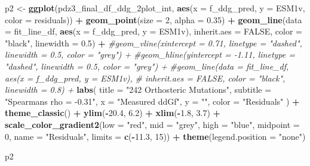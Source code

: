 \documentclass[
]{article}
\newenvironment{Shaded}{\begin{snugshade}}{\end{snugshade}}
\newcommand{\AttributeTok}[1]{\textcolor[rgb]{0.13,0.29,0.53}{#1}}
\newcommand{\CommentTok}[1]{\textcolor[rgb]{0.56,0.35,0.01}{\textit{#1}}}
\newcommand{\ConstantTok}[1]{\textcolor[rgb]{0.56,0.35,0.01}{#1}}
\newcommand{\DecValTok}[1]{\textcolor[rgb]{0.00,0.00,0.81}{#1}}
\newcommand{\FloatTok}[1]{\textcolor[rgb]{0.00,0.00,0.81}{#1}}
\newcommand{\FunctionTok}[1]{\textcolor[rgb]{0.13,0.29,0.53}{\textbf{#1}}}
\newcommand{\NormalTok}[1]{#1}
\newcommand{\OtherTok}[1]{\textcolor[rgb]{0.56,0.35,0.01}{#1}}
\newcommand{\SpecialCharTok}[1]{\textcolor[rgb]{0.81,0.36,0.00}{\textbf{#1}}}
\newcommand{\StringTok}[1]{\textcolor[rgb]{0.31,0.60,0.02}{#1}}
\begin{document}
\begin{Shaded}
\begin{Highlighting}[]
\NormalTok{p2 }\OtherTok{\textless{}{-}} \FunctionTok{ggplot}\NormalTok{(pdz3\_final\_df\_ddg\_2plot\_int, }\FunctionTok{aes}\NormalTok{(}\AttributeTok{x =}\NormalTok{ f\_ddg\_pred, }\AttributeTok{y =}\NormalTok{ ESM1v, }\AttributeTok{color =}\NormalTok{ residuals)) }\SpecialCharTok{+}
  \FunctionTok{geom\_point}\NormalTok{(}\AttributeTok{size =} \DecValTok{2}\NormalTok{, }\AttributeTok{alpha =} \FloatTok{0.35}\NormalTok{) }\SpecialCharTok{+}
  \FunctionTok{geom\_line}\NormalTok{(}\AttributeTok{data =}\NormalTok{ fit\_line\_df, }\FunctionTok{aes}\NormalTok{(}\AttributeTok{x =}\NormalTok{ f\_ddg\_pred, }\AttributeTok{y =}\NormalTok{ ESM1v),}
            \AttributeTok{inherit.aes =} \ConstantTok{FALSE}\NormalTok{, }\AttributeTok{color =} \StringTok{"black"}\NormalTok{, }\AttributeTok{linewidth =} \FloatTok{0.5}\NormalTok{) }\SpecialCharTok{+}
  \CommentTok{\#geom\_vline(xintercept = 0.71, linetype = "dashed", linewidth = 0.5, color = "grey") +}
  \CommentTok{\#geom\_hline(yintercept = {-}1.11, linetype = "dashed", linewidth = 0.5, color = "grey") +}
  \CommentTok{\#geom\_line(data = fit\_line\_df, aes(x = f\_ddg\_pred, y = ESM1v),}
  \CommentTok{\#          inherit.aes = FALSE, color = "black", linewidth = 0.8) +}
  \FunctionTok{labs}\NormalTok{(}
    \AttributeTok{title =} \StringTok{"242 Orthosteric Mutations"}\NormalTok{,}
    \AttributeTok{subtitle =} \StringTok{"Spearman\textquotesingle{}s rho = {-}0.31"}\NormalTok{,}
    \AttributeTok{x =} \StringTok{"Measured ddGf"}\NormalTok{,}
    \AttributeTok{y =} \StringTok{""}\NormalTok{,}
    \AttributeTok{color =} \StringTok{"Residuals"}
\NormalTok{  ) }\SpecialCharTok{+}
  \FunctionTok{theme\_classic}\NormalTok{() }\SpecialCharTok{+}
  \FunctionTok{ylim}\NormalTok{(}\SpecialCharTok{{-}}\FloatTok{20.4}\NormalTok{, }\FloatTok{6.2}\NormalTok{) }\SpecialCharTok{+} \FunctionTok{xlim}\NormalTok{(}\SpecialCharTok{{-}}\FloatTok{1.8}\NormalTok{, }\FloatTok{3.7}\NormalTok{) }\SpecialCharTok{+}
  \FunctionTok{scale\_color\_gradient2}\NormalTok{(}\AttributeTok{low =} \StringTok{"red"}\NormalTok{, }\AttributeTok{mid =} \StringTok{"grey"}\NormalTok{, }\AttributeTok{high =} \StringTok{"blue"}\NormalTok{, }\AttributeTok{midpoint =} \DecValTok{0}\NormalTok{, }\AttributeTok{name =} \StringTok{"Residuals"}\NormalTok{,}
                         \AttributeTok{limits =} \FunctionTok{c}\NormalTok{(}\SpecialCharTok{{-}}\FloatTok{11.3}\NormalTok{, }\DecValTok{15}\NormalTok{)) }\SpecialCharTok{+}
  \FunctionTok{theme}\NormalTok{(}\AttributeTok{legend.position =} \StringTok{"none"}\NormalTok{)}

\NormalTok{p2}
\end{Highlighting}
\end{Shaded}
\end{document}

